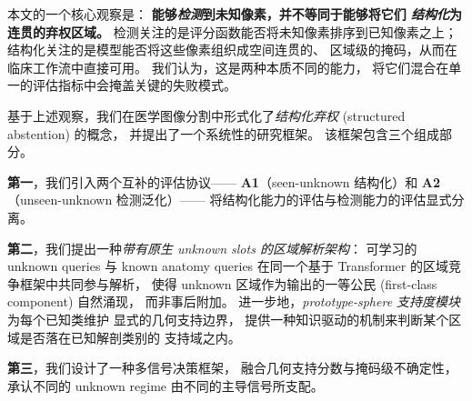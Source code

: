 \documentclass[3p,twocolumn,authoryear]{elsarticle}
\begin{document}
 
 
本文的一个核心观察是：
\textbf{能够\emph{检测}到未知像素，并不等同于能够将它们
\emph{结构化}为连贯的弃权区域。}
检测关注的是评分函数能否将未知像素排序到已知像素之上；
结构化关注的是模型能否将这些像素组织成空间连贯的、
区域级的掩码，从而在临床工作流中直接可用。
我们认为，这是两种本质不同的能力，
将它们混合在单一的评估指标中会掩盖关键的失败模式。
 
基于上述观察，我们在医学图像分割中形式化了\emph{结构化弃权}
(structured abstention) 的概念，
并提出了一个系统性的研究框架。
该框架包含三个组成部分。
 
\textbf{第一}，我们引入两个互补的评估协议——
\textbf{A1}（seen-unknown 结构化）和
\textbf{A2}（unseen-unknown 检测泛化）——
将结构化能力的评估与检测能力的评估显式分离。
 
\textbf{第二}，我们提出一种\emph{带有原生 unknown slots 的区域解析架构}：
可学习的 unknown queries 与 known anatomy queries 在同一个基于
Transformer 的区域竞争框架中共同参与解析，
使得 unknown 区域作为输出的一等公民 (first-class component) 自然涌现，
而非事后附加。
进一步地，\emph{prototype-sphere 支持度模块}为每个已知类维护
显式的几何支持边界，
提供一种知识驱动的机制来判断某个区域是否落在已知解剖类别的
支持域之内。
 
\textbf{第三}，我们设计了一种多信号决策框架，
融合几何支持分数与掩码级不确定性，
承认不同的 unknown regime 由不同的主导信号所支配。
 
\end{document}
